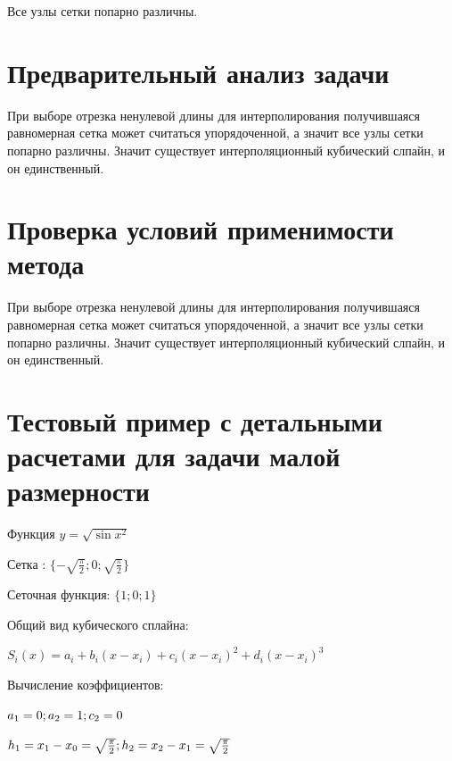Все узлы сетки попарно различны.

\section{Предварительный анализ задачи}

При выборе отрезка ненулевой длины для интерполирования получившаяся равномерная сетка может считаться упорядоченной, а значит все узлы сетки попарно различны. Значит существует интерполяционный кубический слпайн, и он единственный. 


\section{Проверка условий применимости метода}

При выборе отрезка ненулевой длины для интерполирования получившаяся равномерная сетка может считаться упорядоченной, а значит все узлы сетки попарно различны. Значит существует интерполяционный кубический слпайн, и он единственный. 



\section{Тестовый пример с детальными расчетами для задачи малой размерности}

Функция \begin{math} 
	y=\sqrt{\sin{x^{2}}}
\end{math}

Сетка : 
\begin{math} 
	\{-\sqrt{\frac{\pi}{2}};0;\sqrt{\frac{\pi}{2}}\}
\end{math}

Сеточная функция: 
\begin{math} 
	\{1;0;1\}
\end{math}

Общий вид кубического сплайна: 

\begin{math} 
	S_{i}(x)=a_{i}+b_{i}(x-x_{i})+c_{i}(x-x_{i})^{2}+d_{i}(x-x_{i})^{3}
\end{math} 

Вычисление коэффициентов: 


\begin{math} 
	\\
	a_{1}=0;a_{2}=1; c_{2}=0
\end{math}

\begin{math} 
	\\
	h_{1}=x_{1}-x_{0}=\sqrt{\frac{\pi}{2}}; \\ h_{2}=x_{2}-x_{1}=\sqrt{\frac{\pi}{2}}
\end{math}


